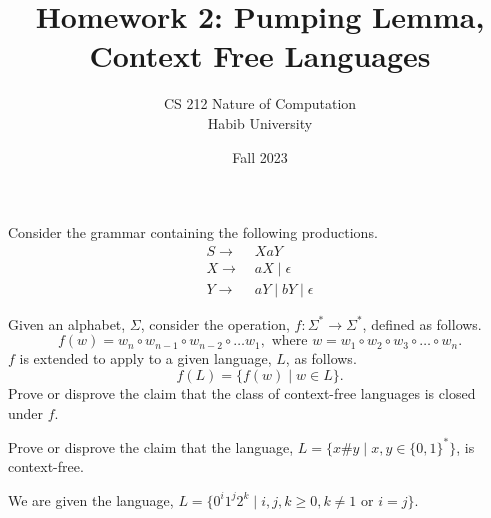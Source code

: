 \documentclass[addpoints]{exam}
\title{Homework 2: Pumping Lemma, Context Free Languages}
\author{CS 212 Nature of Computation\\Habib University}
\date{Fall 2023}
\begin{document}
\maketitle

\begin{questions}
  
\question Consider the grammar containing the following productions.
\begin{align*} 
  S \to &\; XaY\\
  X \to &\; aX \mid \epsilon\\
  Y \to &\; aY \mid bY \mid \epsilon
\end{align*}


\question[5] Given an alphabet, $\Sigma$, consider the operation, $f:\Sigma^*\to\Sigma^*$, defined as follows.
  \[
f(w) = w_n\circ w_{n-1}\circ w_{n-2}\circ\ldots w_{1}, \text{ where } w = w_1\circ w_2\circ w_3\circ\ldots\circ w_n.
  \]
  $f$ is extended to apply to a given language, $L$, as follows.
  \[
    f(L) = \{ f(w) \mid w\in L \}.
  \]
  Prove or disprove the claim that the class of context-free languages is closed under $f$.
  
\question[5] Prove or disprove the claim that the language, $L=\{ x\#y \mid x,y\in\{0,1\}^*\}$, is context-free.

\question We are given the language, $L = \{0^i1^j2^k \mid i,j,k \geq 0, k \neq 1 \text{ or } i = j\}$.
\end{questions}
\end{document}

